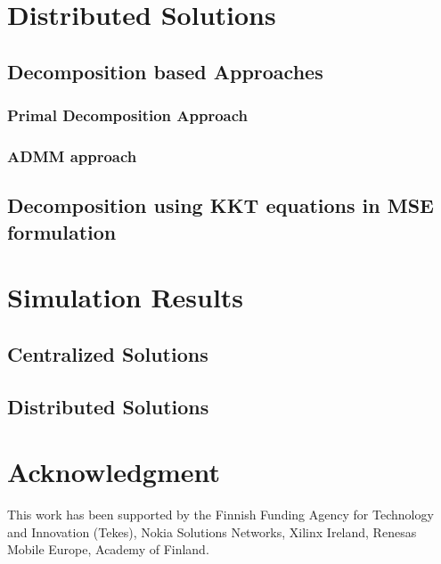 \documentclass[11pt,draftcls,onecolumn,letterpaper]{./../Styles/IEEEtran}
\begin{document}
\section{Distributed Solutions} \label{sec-4}



\subsection{Decomposition based Approaches}

\subsubsection{Primal Decomposition Approach} \label{sec-4.1}


%

\subsubsection{\ac{ADMM} approach} \label{sec-4.2}


%

\subsection{Decomposition using \ac{KKT} equations in \ac{MSE} formulation} \label{sec-4.3}



\section{Simulation Results} \label{sec-5}


\subsection{Centralized Solutions}


\subsection{Distributed Solutions}


\section*{Acknowledgment}
This work has been supported by the Finnish Funding Agency for Technology and Innovation (Tekes), Nokia Solutions Networks, Xilinx Ireland, Renesas Mobile Europe, Academy of Finland.
\end{document}
